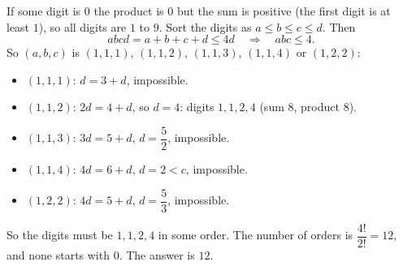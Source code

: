 If some digit is $0$ the product is $0$ but the sum is positive (the first digit is at least $1$), so all digits are $1$ to $9$. Sort the digits as $a\le b\le c\le d$. Then
\[
abcd=a+b+c+d\le4d\quad\Longrightarrow\quad abc\le4 .
\]
So $(a,b,c)$ is $(1,1,1)$, $(1,1,2)$, $(1,1,3)$, $(1,1,4)$ or $(1,2,2)$:
\begin{itemize}
\item $(1,1,1)$: $d=3+d$, impossible.
\item $(1,1,2)$: $2d=4+d$, so $d=4$: digits $1,1,2,4$ (sum $8$, product $8$).
\item $(1,1,3)$: $3d=5+d$, $d=\dfrac{5}{2}$, impossible.
\item $(1,1,4)$: $4d=6+d$, $d=2<c$, impossible.
\item $(1,2,2)$: $4d=5+d$, $d=\dfrac{5}{3}$, impossible.
\end{itemize}
So the digits must be $1,1,2,4$ in some order. The number of orders is $\dfrac{4!}{2!}=12$, and none starts with $0$. The answer is $\boxed{12}$.

